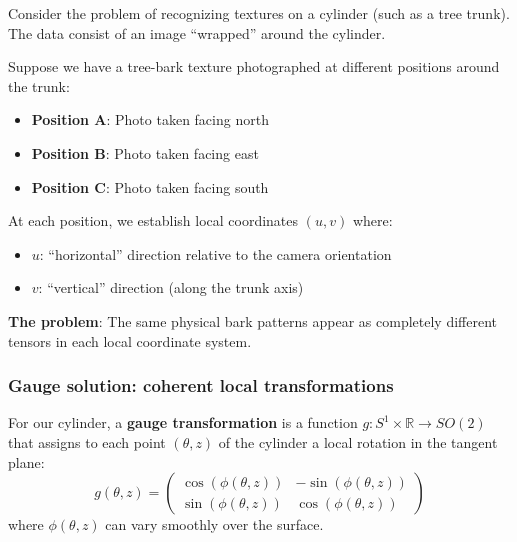 Consider the problem of recognizing textures on a cylinder (such as a tree trunk). The data consist of an image ``wrapped'' around the cylinder.

\begin{example}
Suppose we have a tree-bark texture photographed at different positions around the trunk:
\begin{itemize}
    \item \textbf{Position A}: Photo taken facing north
    \item \textbf{Position B}: Photo taken facing east
    \item \textbf{Position C}: Photo taken facing south
\end{itemize}

At each position, we establish local coordinates $(u,v)$ where:
\begin{itemize}
    \item $u$: ``horizontal'' direction relative to the camera orientation
    \item $v$: ``vertical'' direction (along the trunk axis)
\end{itemize}

\textbf{The problem}: The same physical bark patterns appear as completely different tensors in each local coordinate system.
\end{example}

\subsubsection{Gauge solution: coherent local transformations}

\begin{definition}
For our cylinder, a \textbf{gauge transformation} is a function $g: S^1 \times \mathbb{R} \to SO(2)$ that assigns to each point $(\theta, z)$ of the cylinder a local rotation in the tangent plane:
\begin{equation}
g(\theta, z) = \begin{pmatrix}
\cos(\phi(\theta, z)) & -\sin(\phi(\theta, z)) \\
\sin(\phi(\theta, z)) & \cos(\phi(\theta, z))
\end{pmatrix}
\end{equation}
where $\phi(\theta, z)$ can vary smoothly over the surface.
\end{definition}

